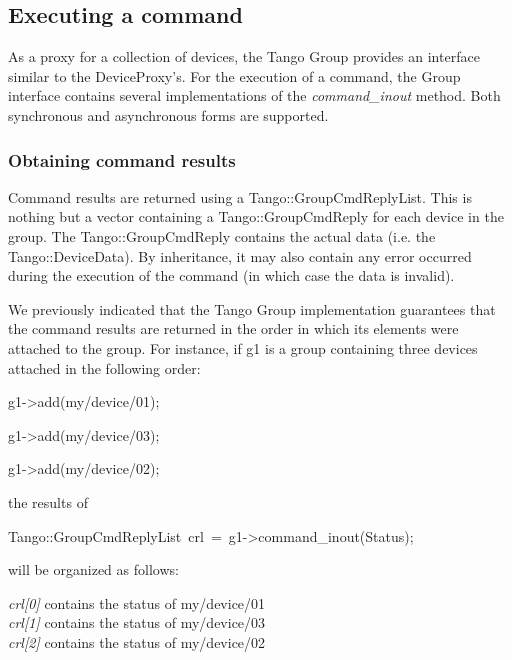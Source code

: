 \subsection{Executing a command}

As a proxy for a collection of devices, the Tango Group provides an
interface similar to the DeviceProxy's. For the execution of a command,
the Group interface contains several implementations
of the \emph{command\_inout} method. Both synchronous
and asynchronous forms are supported. 

\subsubsection{Obtaining command results\label{subsec:Obt-cmd-results}}

Command results are returned using a Tango::GroupCmdReplyList.
This is nothing but a vector containing a Tango::GroupCmdReply
for each device in the group. The Tango::GroupCmdReply contains the
actual data (i.e. the Tango::DeviceData). By inheritance, it may also
contain any error occurred during the execution of the command (in
which case the data is invalid). 

We previously indicated that the Tango Group implementation guarantees
that the command results are returned in the order in which its elements
were attached to the group. For instance, if g1 is a group containing
three devices attached in the following order:
\begin{lyxcode}
g1->add(\textquotedbl{}my/device/01\textquotedbl{});

g1->add(\textquotedbl{}my/device/03\textquotedbl{});

g1->add(\textquotedbl{}my/device/02\textquotedbl{});
\end{lyxcode}
the results of 
\begin{lyxcode}
Tango::GroupCmdReplyList~crl~=~g1->command\_inout(\textquotedbl{}Status\textquotedbl{});
\end{lyxcode}
will be organized as follows:

\emph{crl{[}0{]}} contains the status of my/device/01 \\
\emph{crl{[}1{]}} contains the status of my/device/03 \\
\emph{crl{[}2{]}} contains the status of my/device/02

